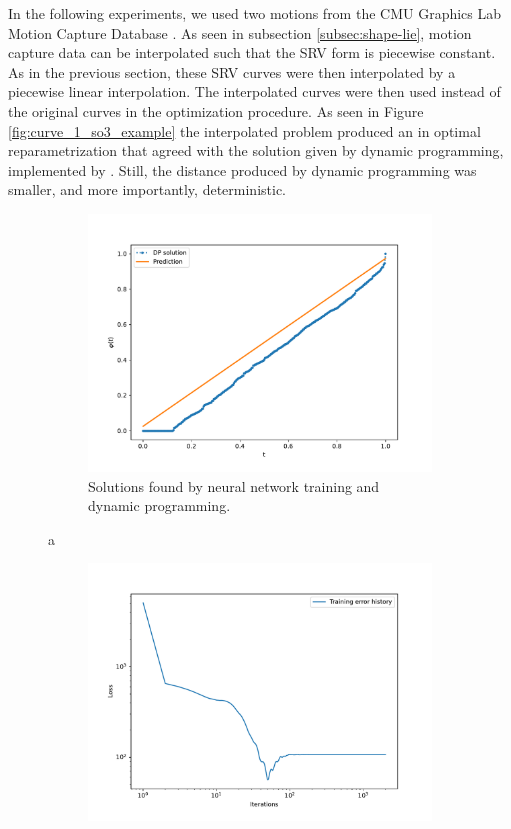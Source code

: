 In the following experiments, we used two motions from the CMU Graphics Lab Motion Capture Database \cite{mocap}. As seen in subsection \ref{subsec:shape-lie}, motion capture data can be interpolated such that the SRV form is piecewise constant. As in the previous section, these SRV curves were then interpolated by a piecewise linear interpolation. The interpolated curves were then used instead of the original curves in the optimization procedure. As seen in Figure \ref{fig:curve_1_so3_example} the interpolated problem produced an in optimal reparametrization that agreed with the solution given by dynamic programming, implemented by \citeauthor{lystad2019}\cite{lystad2019}. Still, the distance produced by dynamic programming was smaller, and more importantly, deterministic.

\begin{figure}[t]
    \begin{subfigure}[t]{0.5\textwidth}
        \centering
        \includegraphics[width=\linewidth]{figures/curve_so3/pc_eks_2/plot_1_0.pdf}
        \caption{Solutions found by neural network training and dynamic programming.}\label{fig:curve_so3_pc_solution}
    \end{subfigure}a
    \begin{subfigure}[t]{0.5\textwidth}
        \centering
        \includegraphics[width=\linewidth]{figures/curve_so3/pc_eks_2/history_plot_1.pdf}

\end{subfigure}
\end{figure}
